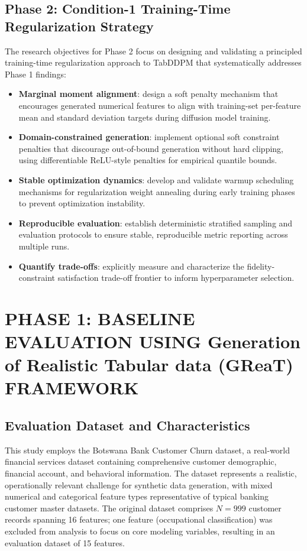 \documentclass[10pt,conference,a4paper]{IEEEtran}
\begin{document}
\subsection{Phase 2: Condition-1 Training-Time Regularization Strategy}
The research objectives for Phase 2 focus on designing and validating a principled training-time regularization approach to TabDDPM that systematically addresses Phase 1 findings:
\begin{itemize}
    \item \textbf{Marginal moment alignment}: design a soft penalty mechanism that encourages generated numerical features to align with training-set per-feature mean and standard deviation targets during diffusion model training.
    \item \textbf{Domain-constrained generation}: implement optional soft constraint penalties that discourage out-of-bound generation without hard clipping, using differentiable ReLU-style penalties for empirical quantile bounds.
    \item \textbf{Stable optimization dynamics}: develop and validate warmup scheduling mechanisms for regularization weight annealing during early training phases to prevent optimization instability.
    \item \textbf{Reproducible evaluation}: establish deterministic stratified sampling and evaluation protocols to ensure stable, reproducible metric reporting across multiple runs.
    \item \textbf{Quantify trade-offs}: explicitly measure and characterize the fidelity-constraint satisfaction trade-off frontier to inform hyperparameter selection.
\end{itemize}

\section{PHASE 1: BASELINE EVALUATION USING Generation of Realistic Tabular data (GReaT) FRAMEWORK}

\subsection{Evaluation Dataset and Characteristics}
This study employs the Botswana Bank Customer Churn dataset, a real-world financial services dataset containing comprehensive customer demographic, financial account, and behavioral information. The dataset represents a realistic, operationally relevant challenge for synthetic data generation, with mixed numerical and categorical feature types representative of typical banking customer master datasets. The original dataset comprises $N = 999$ customer records spanning 16 features; one feature (occupational classification) was excluded from analysis to focus on core modeling variables, resulting in an evaluation dataset of 15 features.
\end{document}
